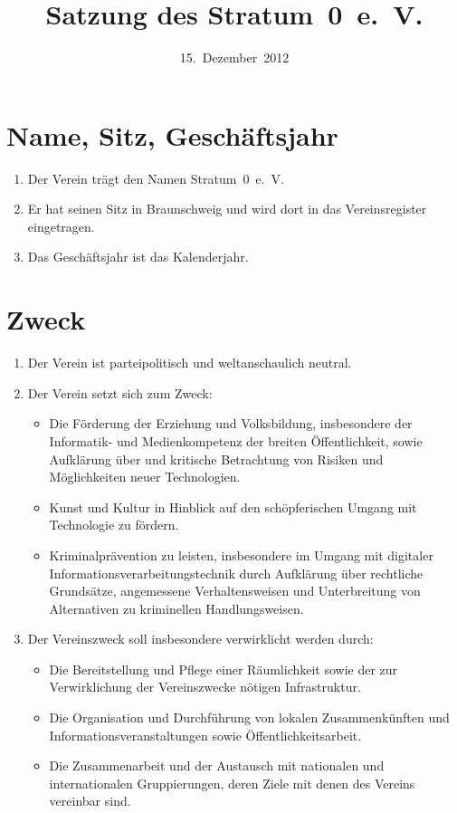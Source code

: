 \documentclass[a4paper,12pt]{scrartcl}
\title{Satzung des Stratum~0~e.~V.}
\date{15.~Dezember~2012}
\begin{document}
\maketitle

\section{Name, Sitz, Geschäftsjahr}
\begin{enumerate}
  \item Der Verein trägt den Namen Stratum~0~e.~V.
  \item Er hat seinen Sitz in Braunschweig und wird dort in das Vereinsregister
    eingetragen.
  \item Das Geschäftsjahr ist das Kalenderjahr.
\end{enumerate}

\section{Zweck}
\begin{enumerate}
  \item Der Verein ist parteipolitisch und weltanschaulich neutral.
  \item Der Verein setzt sich zum Zweck:
    \begin{itemize}
      \item
         Die Förderung der Erziehung und Volksbildung, insbesondere der
         Informatik- und Medienkompetenz der breiten Öffentlichkeit, sowie
         Aufklärung über und kritische Betrachtung von Risiken und
         Möglichkeiten neuer Technologien.
      \item Kunst und Kultur in Hinblick auf den schöpferischen Umgang mit
        Technologie zu fördern.
      \item Kriminalprävention zu leisten, insbesondere im Umgang mit digitaler
        Informationsverarbeitungstechnik durch Aufklärung über rechtliche
        Grundsätze, angemessene Verhaltensweisen und Unterbreitung von
        Alternativen zu kriminellen Handlungsweisen.
    \end{itemize}
  \item Der Vereinszweck soll insbesondere verwirklicht werden durch:
    \begin{itemize}
      \item Die Bereitstellung und Pflege einer Räumlichkeit sowie der zur
        Verwirklichung der Vereinszwecke nötigen Infrastruktur.
      \item Die Organisation und Durchführung von lokalen Zusammenkünften und
        Informationsveranstaltungen sowie Öffentlichkeitsarbeit.
      \item Die Zusammenarbeit und der Austausch mit nationalen und
        internationalen Gruppierungen, deren Ziele mit denen des Vereins
        vereinbar sind.
    \end{itemize}
\end{enumerate}
\end{document}
